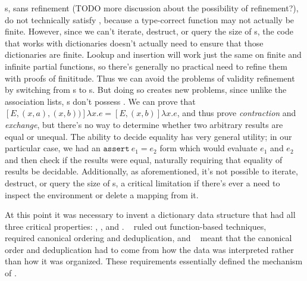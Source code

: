 {{\FPF}s, sans refinement (TODO more discussion about the possibility of refinement?), do not technically
satisfy \SemTot, because a type-correct function may not
actually be finite. However, since we can't iterate, destruct, or query the size of {\FPF}s, the code
that works with dictionaries doesn't actually need to ensure that those dictionaries are finite. Lookup
and insertion will work just the same on finite and infinite partial functions, so there's generally no
practical need to refine them with proofs of finititude. Thus we can avoid the problems of validity refinement
by switching from {\CAL}s to {\FPF}s. But doing so creates new problems, since unlike the association lists,
{\FPF}s don't possess \EqDec. We can prove that
\mbox{$[E, (x, a), (x, b))]\lambda x . e = [E, (x, b)]\lambda x . e$}, and thus prove \emph{contraction} and
\emph{exchange}, but there's no way to determine whether two arbitrary results are equal or unequal.
The ability to decide equality has very general utility; in our particular case, we had an
\mbox{$\texttt{assert}~ e_1 = e_2$} form which would evaluate $e_1$ and $e_2$ and then check if the results
were equal, naturally requiring that equality of results be decidable. Additionally, as aforementioned,
it's not possible to iterate, destruct, or query the size of {\FPF}s, a critical limitation if there's
ever a need to inspect the environment or delete a mapping from it.

At this point it was necessary to invent a dictionary data structure that had all three critical properties:
\SemTot, \SemInj, and \EqDec. \EqDec~ ruled out function-based techniques, \SemInj~ required canonical
ordering and deduplication, and \SemTot~ meant that the canonical order and deduplication had to come from
how the data was interpreted rather than how it was organized. These requirements essentially defined the
mechanism of \dds.

} %

